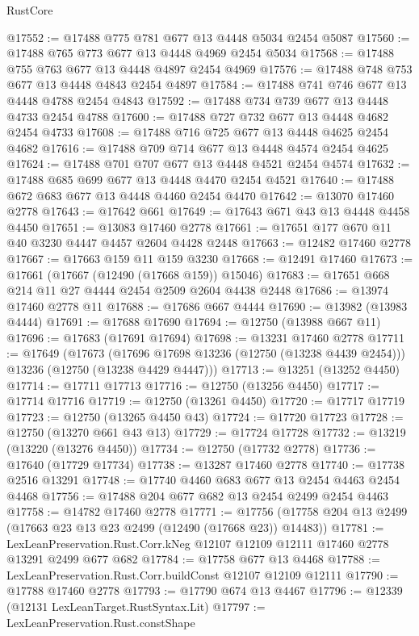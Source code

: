 \begin{lexlean}{RustCore}
\begin{coremodule}
@17552 := @17488 @775 @781 @677 @13 @4448 @5034 @2454 @5087
@17560 := @17488 @765 @773 @677 @13 @4448 @4969 @2454 @5034
@17568 := @17488 @755 @763 @677 @13 @4448 @4897 @2454 @4969
@17576 := @17488 @748 @753 @677 @13 @4448 @4843 @2454 @4897
@17584 := @17488 @741 @746 @677 @13 @4448 @4788 @2454 @4843
@17592 := @17488 @734 @739 @677 @13 @4448 @4733 @2454 @4788
@17600 := @17488 @727 @732 @677 @13 @4448 @4682 @2454 @4733
@17608 := @17488 @716 @725 @677 @13 @4448 @4625 @2454 @4682
@17616 := @17488 @709 @714 @677 @13 @4448 @4574 @2454 @4625
@17624 := @17488 @701 @707 @677 @13 @4448 @4521 @2454 @4574
@17632 := @17488 @685 @699 @677 @13 @4448 @4470 @2454 @4521
@17640 := @17488 @672 @683 @677 @13 @4448 @4460 @2454 @4470
@17642 := @13070 @17460 @2778
@17643 := @17642 @661
@17649 := @17643 @671 @43 @13 @4448 @4458 @4450
@17651 := @13083 @17460 @2778
@17661 := @17651 @177 @670 @11 @40 @3230 @4447 @4457 @2604 @4428 @2448
@17663 := @12482 @17460 @2778
@17667 := @17663 @159 @11 @159 @3230
@17668 := @12491 @17460
@17673 := @17661 (@17667 (@12490 (@17668 @159)) @15046)
@17683 := @17651 @668 @214 @11 @27 @4444 @2454 @2509 @2604 @4438 @2448
@17686 := @13974 @17460 @2778 @11
@17688 := @17686 @667 @4444
@17690 := @13982 (@13983 @4444)
@17691 := @17688 @17690
@17694 := @12750 (@13988 @667 @11)
@17696 := @17683 (@17691 @17694)
@17698 := @13231 @17460 @2778
@17711 := @17649
    (@17673
      (@17696 @17698 @13236 (@12750 (@13238 @4439 @2454)))
      @13236
      (@12750 (@13238 @4429 @4447)))
@17713 := @13251 (@13252 @4450)
@17714 := @17711 @17713
@17716 := @12750 (@13256 @4450)
@17717 := @17714 @17716
@17719 := @12750 (@13261 @4450)
@17720 := @17717 @17719
@17723 := @12750 (@13265 @4450 @43)
@17724 := @17720 @17723
@17728 := @12750 (@13270 @661 @43 @13)
@17729 := @17724 @17728
@17732 := @13219 (@13220 (@13276 @4450))
@17734 := @12750 (@17732 @2778)
@17736 := @17640 (@17729 @17734)
@17738 := @13287 @17460 @2778
@17740 := @17738 @2516 @13291
@17748 := @17740 @4460 @683 @677 @13 @2454 @4463 @2454 @4468
@17756 := @17488 @204 @677 @682 @13 @2454 @2499 @2454 @4463
@17758 := @14782 @17460 @2778
@17771 := @17756 (@17758 @204 @13 @2499 (@17663 @23 @13 @23 @2499 (@12490 (@17668 @23)) @14483))
@17781 := LexLeanPreservation.Rust.Corr.kNeg
    @12107
    @12109
    @12111
    @17460
    @2778
    @13291
    @2499
    @677
    @682
@17784 := @17758 @677 @13 @4468
@17788 := LexLeanPreservation.Rust.Corr.buildConst @12107 @12109 @12111
@17790 := @17788 @17460 @2778
@17793 := @17790 @674 @13 @4467
@17796 := @12339 (@12131 LexLeanTarget.RustSyntax.Lit)
@17797 := LexLeanPreservation.Rust.constShape

\end{coremodule}
\end{lexlean}
